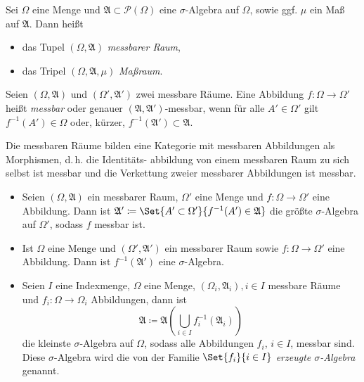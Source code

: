 \documentclass{cheat-sheet}
\newcommand{\PS}{\mathcal{P}} %
\newcommand{\PSO}{\PS(\Omega)} %
\newcommand{\Alg}{\mathfrak{A}} %
\begin{document}
\begin{defn}
  Sei $\Omega$ eine Menge und $\Alg \subset \PSO$ eine $\sigma$-Algebra auf $\Omega$, sowie ggf. $\mu$ ein Maß auf $\Alg$. Dann heißt
  \begin{itemize}
    \item das Tupel $(\Omega, \Alg)$ \emph{messbarer Raum},
    \item das Tripel $(\Omega, \Alg, \mu)$ \emph{Maßraum}.
  \end{itemize}
\end{defn}

\begin{defn}
  Seien $(\Omega, \Alg)$ und $(\Omega', \Alg')$ zwei messbare Räume. Eine Abbildung $f : \Omega \to \Omega'$ heißt \emph{messbar} oder genauer $(\Alg, \Alg')$-messbar, wenn für alle $A' \in \Omega'$ gilt $f^{-1}(A') \in \Omega$ oder, kürzer, $f^{-1}(\Alg') \subset \Alg$.
\end{defn}

\begin{bem}
  Die messbaren Räume bilden eine Kategorie mit messbaren Abbildungen als Morphismen, d.\,h. die Identitäts- abbildung von einem messbaren Raum zu sich selbst ist messbar und die Verkettung zweier messbarer Abbildungen ist messbar.
\end{bem}

\begin{satz}
  \begin{itemize}
    \item Seien $(\Omega, \Alg)$ ein messbarer Raum, $\Omega'$ eine Menge und $f : \Omega \to \Omega'$ eine Abbildung. Dann ist $\Alg' \coloneqq \Set{ A' \subset \Omega' }{ f^{-1}(A') \in \Alg }$ die größte $\sigma$-Algebra auf $\Omega'$, sodass $f$ messbar ist.
    \item Ist $\Omega$ eine Menge und $(\Omega', \Alg')$ ein messbarer Raum sowie $f : \Omega \to \Omega'$ eine Abbildung. Dann ist $f^{-1}(\Alg')$ eine $\sigma$-Algebra.
    \item Seien $I$ eine Indexmenge, $\Omega$ eine Menge, $(\Omega_i, \Alg_i), i \in I$ messbare Räume und $f_i : \Omega \to \Omega_i$ Abbildungen, dann ist
    \[ \Alg \coloneqq \Alg\left( \bigcup_{i \in I} f_i^{-1}(\Alg_i) \right) \]
    die kleinste $\sigma$-Algebra auf $\Omega$, sodass alle Abbildungen $f_i$, $i \in I$, messbar sind. Diese $\sigma$-Algebra wird die von der Familie $\Set{ f_i }{i \in I}$ \emph{erzeugte $\sigma$-Algebra} genannt.
  \end{itemize}
\end{satz}
\end{document}
